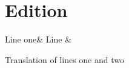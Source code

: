 \documentclass{memoir}
\begin{document}
\mainmatter
\chapter{Edition}

\begin{pairs}
\begin{Leftside}
\beginnumbering
\begin{astanza}
Line one&
Line &
\end{astanza}
\endnumbering
\end{Leftside}

\begin{Rightside}
\beginnumbering
\autopar
\noindent Translation of lines one and two\pend
\endnumbering
\end{Rightside}
\end{pairs}

\Columns

\end{document}
